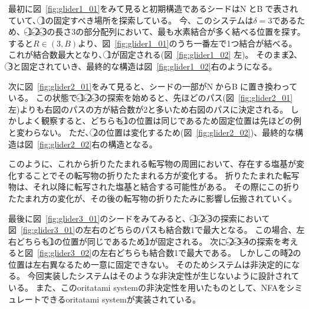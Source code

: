 \documentclass[a4,11pt]{article}
\begin{document}
最初に図~\ref{fig:glider1_01}をみて見ると初期構造であるシードは\textcircled{\scriptsize N}と\textcircled{\scriptsize B}で表されていて、\textcircled{\scriptsize 1}の固定すべき場所を探索している。
今、このシステムは$\delta =3$であるため、{-}\textcircled{\scriptsize 1}{-}\textcircled{\scriptsize 2}{-}\textcircled{\scriptsize 3}の長さ3の部分配列において、最も水素結合が多く結べる位置を探す。
すると$R \in (3,B)$より、図~\ref{fig:glider1_01}のうち一番左で1つ結合が結べる。
これが結合数最大となり、\textcircled{\scriptsize 1}が固定される(図~\ref{fig:glider1_02} 左)。
そのまま\textcircled{\scriptsize 2}、\textcircled{\scriptsize 3}と固定されていき、最終的な構造は図~\ref{fig:glider1_02}右のようになる。

次に図~\ref{fig:glider2_01}をみて見ると、シードの一部が\textcircled{\scriptsize N}から\textcircled{\scriptsize B}に置き換わっている。
この状態で{-}\textcircled{\scriptsize 1}{-}\textcircled{\scriptsize 2}{-}\textcircled{\scriptsize 3}の探索を始めると、先ほどのパス(図~\ref{fig:glider2_01} 左)よりも右図のパスの方が結合数が2と多いため右図のパスに決定される。
しかしよく観察すると、どちらも\textcircled{\scriptsize 1}の位置は同じであるため固定位置は先ほどの例と変わらない。
ただ、\textcircled{\scriptsize 2}の位置は変化するため(図~\ref{fig:glider2_02})、最終的な構造は図~\ref{fig:glider2_02}右の構造となる。

このように、これから折りたたまれる転写物の周囲において、存在する塩基が変化することでその転写物の折りたたまれる方が変化する。
折りたたまれた転写物は、それ以降に転写された塩基と結合する可能性がある。
その際にこの折りたたまれ方の変化が、その後の転写物の折りたたみに影響し伝搬されていく。

最後に図~\ref{fig:glider3_01}のシードをみてみると、{-}\textcircled{\scriptsize 1}{-}\textcircled{\scriptsize 2}{-}\textcircled{\scriptsize 3}の探索において図~\ref{fig:glider3_01}の左右のどちらのパスも結合数1で最大となる。
この場合、左右どちらも\textcircled{\scriptsize 1}の位置が同じであるため\textcircled{\scriptsize 1}が固定される。
次に{-}\textcircled{\scriptsize 2}{-}\textcircled{\scriptsize 3}{-}\textcircled{\scriptsize 4}の探索を考えると図~\ref{fig:glider3_02}の左右どちらも結合数1で最大である。
しかしこの時\textcircled{\scriptsize 2}の位置は左右異なるため一意に固定できない。
そのためシステムは非決定的になる。
今回実装したシステムはそのような非決定性が生じないように設計されている。
また、このoritatami systemの非決定性を用いたものとして、NFAをシミュレートできるoritatami systemが実装されている\cite{nfaoritatami}。
\end{document}
